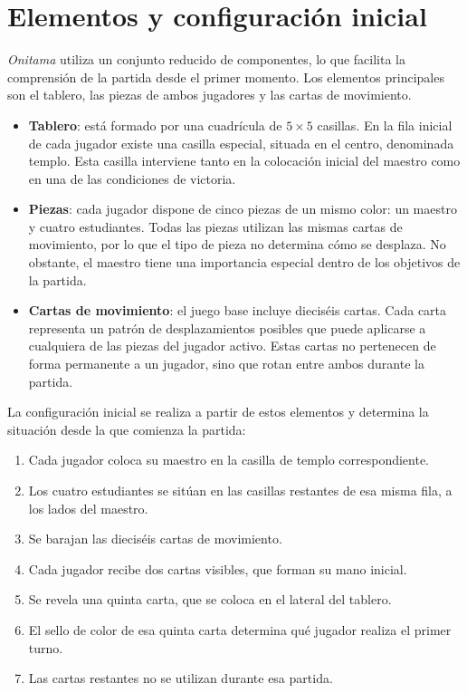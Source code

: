 \section{Elementos y configuración inicial}
\label{sec:elementos-configuracion-inicial}

\textit{Onitama} utiliza un conjunto reducido de componentes, lo que facilita la comprensión de la partida desde el primer momento. Los elementos principales son el tablero, las piezas de ambos jugadores y las cartas de movimiento.

\begin{itemize}
    \item \textbf{Tablero}: está formado por una cuadrícula de \(5 \times 5\) casillas. En la fila inicial de cada jugador existe una casilla especial, situada en el centro, denominada templo. Esta casilla interviene tanto en la colocación inicial del maestro como en una de las condiciones de victoria.

    \item \textbf{Piezas}: cada jugador dispone de cinco piezas de un mismo color: un maestro y cuatro estudiantes. Todas las piezas utilizan las mismas cartas de movimiento, por lo que el tipo de pieza no determina cómo se desplaza. No obstante, el maestro tiene una importancia especial dentro de los objetivos de la partida.

    \item \textbf{Cartas de movimiento}: el juego base incluye dieciséis cartas. Cada carta representa un patrón de desplazamientos posibles que puede aplicarse a cualquiera de las piezas del jugador activo. Estas cartas no pertenecen de forma permanente a un jugador, sino que rotan entre ambos durante la partida.
\end{itemize}

La configuración inicial se realiza a partir de estos elementos y determina la situación desde la que comienza la partida:

\begin{enumerate}
    \item Cada jugador coloca su maestro en la casilla de templo correspondiente.
    \item Los cuatro estudiantes se sitúan en las casillas restantes de esa misma fila, a los lados del maestro.
    \item Se barajan las dieciséis cartas de movimiento.
    \item Cada jugador recibe dos cartas visibles, que forman su mano inicial.
    \item Se revela una quinta carta, que se coloca en el lateral del tablero.
    \item El sello de color de esa quinta carta determina qué jugador realiza el primer turno.
    \item Las cartas restantes no se utilizan durante esa partida.
\end{enumerate}

